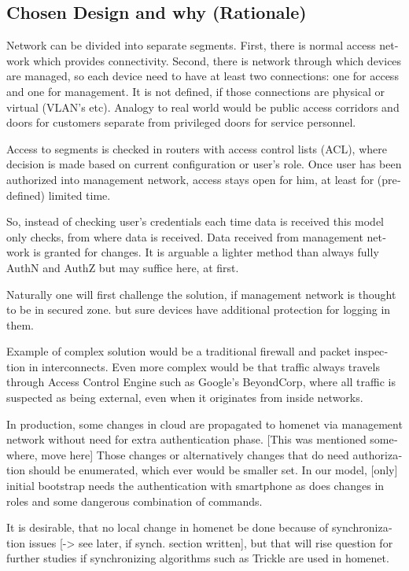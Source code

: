 \documentclass[12pt,a4paper,english]{tutthesis}
\begin{document}
\begin{otherlanguage}{english}
\section{Chosen Design and why (Rationale)}
\label{sec-4-3}

Network can be divided into separate segments. 
First, there is normal access network which provides
connectivity. Second, there is network through which devices are
managed, so each device need to have at least two connections: one for
access and one for management. It is not defined, if those connections
are physical or virtual (VLAN's etc). 
Analogy to real world would be public access corridors and doors for
customers separate from privileged doors for service personnel.

Access to segments is checked in routers with access control lists
(ACL), where decision is made based on current configuration or user's
role.  Once user has been authorized into management network, access
stays open for him, at least for (predefined) limited time.

So, instead of checking user's credentials each time data is received
this model only checks, from where data is received. 
Data received from management network is granted for changes.
It is arguable a lighter method than always
fully AuthN and AuthZ but may suffice here, at first.

Naturally one will first challenge the solution, if
management network is thought to be in secured zone.
but sure devices have additional protection for logging in them. 


Example of complex solution would be a traditional firewall and packet
inspection in interconnects. Even more complex would be that traffic
always travels through Access Control Engine such as Google's
BeyondCorp\cite{2014-beyondcorp}, where all
traffic is suspected as being external, even when it originates from inside networks.

In production, some changes in cloud are propagated to homenet via
management network without need for extra authentication phase.  [This
was mentioned somewhere, move here] Those changes or alternatively
changes that do need authorization should be enumerated, which ever
would be smaller set. In our model, [only] initial bootstrap needs the
authentication with smartphone as does changes in roles and some
dangerous combination of commands.

It is desirable, that no local change in homenet be done because of
synchronization issues [-> see later, if synch. section written],
but that will rise question for further studies if synchronizing algorithms such
as Trickle are used in homenet.





\end{otherlanguage}
\end{document}
